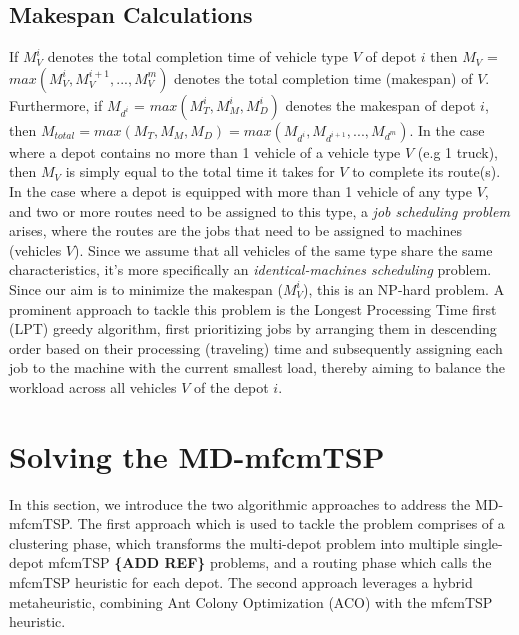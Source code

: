 \documentclass{article}
\begin{document}
	\subsection{Makespan Calculations}
	If $M_V^i$ denotes the total completion time of vehicle type $V$ of depot $i$ then $M_V$ = $max(M_V^i, M_V^{i+1}, ..., M_V^m)$ denotes the total completion time (makespan) of $V$. Furthermore, if $M_{d^i}$ = $max(M_T^i, M_M^i, M_D^i)$ denotes the makespan of depot $i$, then $M_{total} = max(M_T, M_M, M_D) = max(M_{d^i}, M_{d^{i+1}}, ..., M_{d^m})$. In the case where a depot contains no more than 1 vehicle of a vehicle type $V$ (e.g 1 truck), then $M_V$ is simply equal to the total time it takes for $V$ to complete its route(s).
	In the case where a depot is equipped with more than 1 vehicle of any type $V$, and two or more routes need to be assigned to this type, a \textit{job scheduling problem} arises, where the routes are the jobs that need to be assigned to machines (vehicles $V$). Since we assume that all vehicles of the same type share the same characteristics, it's more specifically an \textit{identical-machines scheduling} problem. Since our aim is to minimize the makespan ($M_V^i$), this is an NP-hard problem. A prominent approach to tackle this problem is the Longest Processing Time first (LPT) greedy algorithm, first prioritizing jobs by arranging them in descending order based on their processing (traveling) time and subsequently assigning each job to the machine with the current smallest load, thereby aiming to balance the workload across all vehicles $V$ of the depot $i$.
	\par
	\section{Solving the MD-mfcmTSP}
	In this section, we introduce the two algorithmic approaches to address the MD-mfcmTSP. The first approach which is used to tackle the problem comprises of a clustering phase, which transforms the multi-depot problem into multiple single-depot mfcmTSP \textbf{\{ADD REF\}} problems, and a routing phase which calls the mfcmTSP heuristic for each depot. The second approach leverages a hybrid metaheuristic, combining Ant Colony Optimization (ACO) with the mfcmTSP heuristic.
\end{document}
